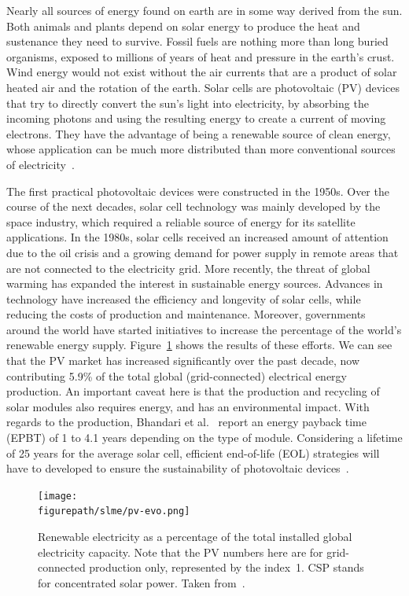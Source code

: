 \begin{refsection}
Nearly all sources of energy found on earth are in some way derived from the 
sun. Both animals and plants depend on solar energy to produce the heat and 
sustenance they need to survive. Fossil fuels are nothing more than long 
buried organisms, exposed to millions of years of heat and pressure in the 
earth's crust. Wind energy would not exist without the air currents that are a 
product of solar heated air and the rotation of the earth. Solar cells are 
photovoltaic (\gls{PV}) devices that try to directly convert the sun's 
light into electricity, by absorbing the incoming photons and using the 
resulting energy to create a current of moving electrons. They have the 
advantage of being a renewable source of clean energy, whose application can 
be much more distributed than more conventional sources of 
electricity~\cite{Marsden2011}. 
 
The first practical photovoltaic devices were constructed in the 1950s. Over 
the course of the next decades, solar cell technology was mainly developed by 
the space industry, which required a reliable source of energy for its 
satellite applications. In the 1980s, solar cells received an increased amount 
of attention due to the oil crisis and a growing demand for power supply in 
remote areas that are not connected to the electricity grid. More recently, 
the threat of global warming has expanded the interest in sustainable energy 
sources. Advances in technology have increased the efficiency and longevity of 
solar cells, while reducing the costs of production and maintenance. 
Moreover, governments around the world have started initiatives to increase the 
percentage of the world's renewable energy supply. 
Figure~\ref{slme:fig-pv_evo} shows the results of these efforts. We can see 
that the \gls{PV} market has increased significantly over the past decade, now 
contributing 5.9\% of the total global (grid-connected) electrical energy production. 
An important caveat here is that the production and recycling of solar modules 
also requires energy, and has an environmental impact. With regards to the 
production, Bhandari et al.~\cite{Bhandari2015} report an energy payback 
time (EPBT) of 1 to 4.1 years depending on the type of module. Considering 
a lifetime of 25 years for the average solar cell, efficient end-of-life (EOL) 
strategies will have to developed to ensure the sustainability of photovoltaic 
devices~\cite{Chowdhury2020}.
 
\begin{figure}[hb]  
\centering 
\texttt{[image: \\figurepath/slme/pv-evo.png]} 
\caption{Renewable electricity as a percentage of the total installed global 
electricity capacity. Note that the \gls{PV} numbers here are for grid-connected production only, represented by the index~1. CSP stands for concentrated solar power. Taken from~\cite{NREL2017}.}
\label{slme:fig-pv_evo}  
\end{figure}  


\end{refsection}
